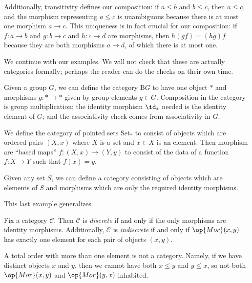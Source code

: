 \documentclass[../notes.tex]{subfiles}
\begin{document}
Additionally, transitivity defines our composition: if $a\le b$ and $b\le c$, then $a\le c$, and the morphism representing $a\le c$ is unambiguous because there is at most one morphism $a\to c$. This uniqueness is in fact crucial for our composition: if $f:a\to b$ and $g:b\to c$ and $h:c\to d$ are morphisms, then $h(gf)=(hg)f$ because they are both morphisms $a\to d$, of which there is at most one.

We continue with our examples. We will not check that these are actually categories formally; perhaps the reader can do the checks on their own time.
\begin{example}[Groups]
	Given a group $G$, we can define the category $\mathrm BG$ to have one object $*$ and morphisms $g:*\to*$ given by group elements $g\in G$. Composition in the category is group multiplication; the identity morphism $\id_*$ needed is the identity element of $G$; and the associativity check comes from associativity in $G$.
\end{example}
\begin{example}
	We define the category of pointed sets $\mathrm{Set}_*$ to consist of objects which are ordered pairs $(X,x)$ where $X$ is a set and $x\in X$ is an element. Then morphism are ``based maps'' $f:(X,x)\to(Y,y)$ to consist of the data of a function $f:X\to Y$ such that $f(x)=y$.
\end{example}
\begin{example}
	Given any set $S$, we can define a category consisting of objects which are elements of $S$ and morphisms which are only the required identity morphisms.
\end{example}
This last example generalizes.
\begin{definition}
	Fix a category $\mathcal C$. Then $\mathcal C$ is \textit{discrete} if and only if the only morphisms are identity morphisms. Additionally, $\mathcal C$ is \textit{indiscrete} if and only if $\op{Mor}(x,y)$ has exactly one element for each pair of objects $(x,y)$.
\end{definition}
\begin{warn}
	A total order with more than one element is not a category. Namely, if we have distinct objects $x$ and $y$, then we cannot have both $x\le y$ and $y\le x$, so not both $\op{Mor}(x,y)$ and $\op{Mor}(y,x)$ inhabited.
\end{warn}
\end{document}
